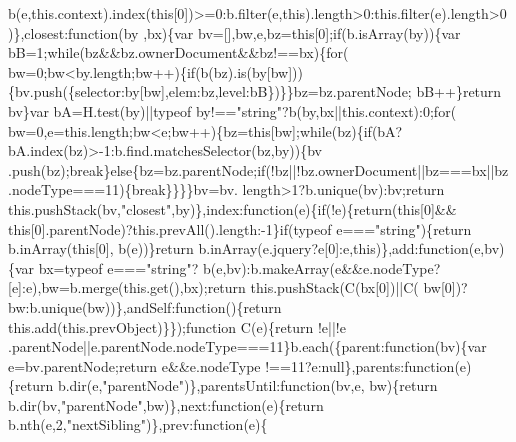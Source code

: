\begin{DoxyCode}
      b(e,this.context).index(\textcolor{keyword}{this}[0])>=0:b.filter(e,\textcolor{keyword}{this}).length>0:this.filter(e).length>0)\},closest:\textcolor{keyword}{function}(by
      ,bx)\{var bv=[],bw,e,bz=\textcolor{keyword}{this}[0];\textcolor{keywordflow}{if}(b.isArray(by))\{var bB=1;\textcolor{keywordflow}{while}(bz&&bz.ownerDocument&&bz!==bx)\{\textcolor{keywordflow}{for}(
      bw=0;bw<by.length;bw++)\{\textcolor{keywordflow}{if}(b(bz).is(by[bw]))\{bv.push(\{selector:by[bw],elem:bz,level:bB\})\}\}bz=bz.parentNode;
      bB++\}\textcolor{keywordflow}{return} bv\}var bA=H.test(by)||typeof by!==\textcolor{stringliteral}{"string"}?b(by,bx||this.context):0;\textcolor{keywordflow}{for}(
      bw=0,e=this.length;bw<e;bw++)\{bz=\textcolor{keyword}{this}[bw];\textcolor{keywordflow}{while}(bz)\{\textcolor{keywordflow}{if}(bA?bA.index(bz)>-1:b.find.matchesSelector(bz,by))\{bv
      .push(bz);\textcolor{keywordflow}{break}\}\textcolor{keywordflow}{else}\{bz=bz.parentNode;\textcolor{keywordflow}{if}(!bz||!bz.ownerDocument||bz===bx||bz.nodeType===11)\{\textcolor{keywordflow}{break}\}\}\}\}bv=bv.
      length>1?b.unique(bv):bv;\textcolor{keywordflow}{return} this.pushStack(bv,\textcolor{stringliteral}{"closest"},by)\},index:\textcolor{keyword}{function}(e)\{\textcolor{keywordflow}{if}(!e)\{\textcolor{keywordflow}{return}(\textcolor{keyword}{this}[0]&&\textcolor{keyword}{
      this}[0].parentNode)?this.prevAll().length:-1\}\textcolor{keywordflow}{if}(typeof e===\textcolor{stringliteral}{"string"})\{\textcolor{keywordflow}{return} b.inArray(\textcolor{keyword}{this}[0],
      b(e))\}\textcolor{keywordflow}{return} b.inArray(e.jquery?e[0]:e,\textcolor{keyword}{this})\},add:\textcolor{keyword}{function}(e,bv)\{var bx=typeof e===\textcolor{stringliteral}{"string"}?
      b(e,bv):b.makeArray(e&&e.nodeType?[e]:e),bw=b.merge(this.\textcolor{keyword}{get}(),bx);\textcolor{keywordflow}{return} this.pushStack(C(bx[0])||C(
      bw[0])?bw:b.unique(bw))\},andSelf:\textcolor{keyword}{function}()\{\textcolor{keywordflow}{return} this.add(this.prevObject)\}\});\textcolor{keyword}{function} C(e)\{\textcolor{keywordflow}{return} !e||!e
      .parentNode||e.parentNode.nodeType===11\}b.each(\{parent:\textcolor{keyword}{function}(bv)\{var e=bv.parentNode;\textcolor{keywordflow}{return} e&&e.nodeType
      !==11?e:null\},parents:\textcolor{keyword}{function}(e)\{\textcolor{keywordflow}{return} b.dir(e,\textcolor{stringliteral}{"parentNode"})\},parentsUntil:\textcolor{keyword}{function}(bv,e,
      bw)\{\textcolor{keywordflow}{return} b.dir(bv,\textcolor{stringliteral}{"parentNode"},bw)\},next:\textcolor{keyword}{function}(e)\{\textcolor{keywordflow}{return} b.nth(e,2,\textcolor{stringliteral}{"nextSibling"})\},prev:\textcolor{keyword}{function}(e)\{\textcolor{keywordflow}{
}
\end{DoxyCode}

